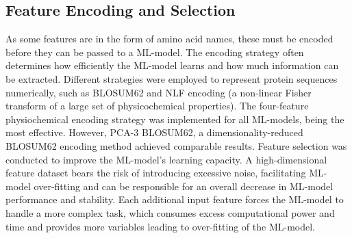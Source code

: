 \subsection{Feature Encoding and Selection}

As some features are in the form of amino acid names, these must be
encoded before they can be passed to a ML-model. The
encoding strategy often determines how efficiently the ML-model learns
and how much information can be extracted. Different strategies were
employed to represent protein sequences numerically, such as BLOSUM62\cite{Henikoff1992} and NLF\cite{Nanni2011} encoding (a non-linear Fisher transform of a large set of physicochemical properties). The four-feature physiochemical encoding strategy\cite{Abhinandan2010} was implemented for all ML-models, being
the most effective. However, PCA-3 BLOSUM62, a dimensionality-reduced
BLOSUM62 encoding method achieved comparable results.
Feature selection was conducted to improve the ML-model's learning
capacity. A high-dimensional feature dataset bears the risk of
introducing excessive noise, facilitating ML-model over-fitting and can be
responsible for an overall decrease in ML-model performance and
stability. Each additional input feature forces the ML-model to
handle a more complex task, which consumes excess computational power
and time and provides more variables leading to over-fitting of the ML-model. 



